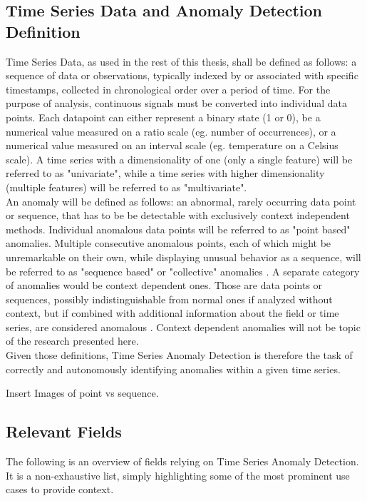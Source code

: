 \documentclass[12pt,oneside]{article}
\begin{document}
\subsection{Time Series Data and Anomaly Detection Definition}
Time Series Data, as used in the rest of this thesis, shall be defined as follows: a sequence of data or observations, typically indexed by or associated with specific timestamps, collected in chronological order over a period of time.
For the purpose of analysis, continuous signals must be converted into individual data points. Each datapoint can either represent a binary state (1 or 0), be a numerical value measured on a ratio scale (eg. number of occurrences), or a numerical value measured on an interval scale (eg. temperature on a Celsius scale).
A time series with a dimensionality of one (only a single feature) will be referred to as "univariate", while a time series with higher dimensionality (multiple features) will be referred to as "multivariate". \\
An anomaly will be defined as follows: an abnormal, rarely occurring data point or sequence, that has to be be detectable with exclusively context independent methods. Individual anomalous data points will be referred to as "point based" anomalies. Multiple consecutive anomalous points, each of which might be unremarkable on their own, while displaying unusual behavior as a sequence,  will be referred to as "sequence based" or "collective" anomalies \parencites[p.~3]{liu2024elephant}[p.~8]{chalapathy2019deeplearninganomalydetection}. A separate category of anomalies would be context dependent ones. Those are data points or sequences, possibly indistinguishable from normal ones if analyzed without context, but if combined with additional information about the field or time series, are considered anomalous \citep[pp.~7-8]{chalapathy2019deeplearninganomalydetection}. Context dependent anomalies will not be topic of the research presented here. \\
Given those definitions, Time Series Anomaly Detection is therefore the task of correctly and autonomously identifying anomalies within a given time series.

Insert Images of point vs sequence.

\subsection{Relevant Fields}

The following is an overview of fields relying on Time Series Anomaly Detection. It is a non-exhaustive list, simply highlighting some of the most prominent use cases to provide context. \
\end{document}
